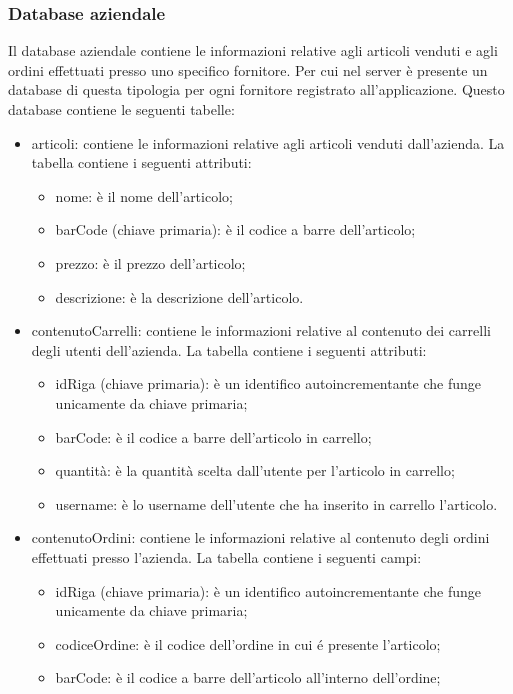 \documentclass[12pt, a4paper, titlepage]{report}
\begin{document}
	\subsubsection{Database aziendale}
	Il database aziendale contiene le informazioni relative agli articoli venduti e agli ordini effettuati presso uno specifico fornitore. Per cui nel server è presente un database di questa tipologia per ogni fornitore registrato all'applicazione. Questo database contiene le seguenti tabelle:
	\begin{itemize}
		\item articoli: contiene le informazioni relative agli articoli venduti dall'azienda. La tabella contiene i seguenti attributi:
		\begin{itemize}
			\item nome: è il nome dell'articolo;
			\item barCode (chiave primaria): è il codice a barre dell'articolo;
			\item prezzo: è il prezzo dell'articolo;
			\item descrizione: è la descrizione dell'articolo.
		\end{itemize}
		\item contenutoCarrelli: contiene le informazioni relative al contenuto dei carrelli degli utenti dell'azienda. La tabella contiene i seguenti attributi:
		\begin{itemize}
			\item idRiga (chiave primaria): è un identifico autoincrementante che funge unicamente da chiave primaria;
			\item barCode: è il codice a barre dell'articolo in carrello;
			\item quantità: è la quantità scelta dall'utente per l'articolo in carrello;
			\item username: è lo username dell'utente che ha inserito in carrello l'articolo.
		\end{itemize}
		\item contenutoOrdini: contiene le informazioni relative al contenuto degli ordini effettuati presso l'azienda. La tabella contiene i seguenti campi:
		\begin{itemize}
			\item idRiga (chiave primaria): è un identifico autoincrementante che funge unicamente da chiave primaria;
			\item codiceOrdine: è il codice dell'ordine in cui é presente l'articolo;
			\item barCode: è il codice a barre dell'articolo all'interno dell'ordine;

\end{itemize}
\end{itemize}
\end{document}
